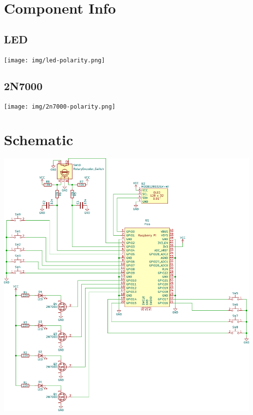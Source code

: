 \section{Component Info}


\begin{minipage}[t]{0.4\textwidth}
\begin{framed}
\subsection*{LED}
\texttt{[image: img/led-polarity.png]}
\end{framed}
\end{minipage}

\begin{minipage}[t]{0.4\textwidth}
\begin{framed}
\subsection*{2N7000}
\texttt{[image: img/2n7000-polarity.png]}
\end{framed}
\end{minipage}

\section{Schematic}
\includegraphics[width=\textwidth]{img/macropad-rev1-schematic.png}

